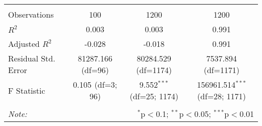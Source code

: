 \begin{table}[!htbp]
\begin{tabular}{@{\extracolsep{5pt}}lccc}
\hline \\[-1.8ex]
 Observations & 100 & 1200 & 1200 \\
 $R^2$ & 0.003 & 0.003 & 0.991 \\
 Adjusted $R^2$ & -0.028 & -0.018 & 0.991 \\
 Residual Std. Error & 81287.166 (df=96) & 80284.529 (df=1174) & 7537.894 (df=1171) \\
 F Statistic & 0.105$^{}$ (df=3; 96) & 9.552$^{***}$ (df=25; 1174) & 156961.514$^{***}$ (df=28; 1171) \\
\hline
\hline \\[-1.8ex]
\textit{Note:} & \multicolumn{3}{r}{$^{*}$p$<$0.1; $^{**}$p$<$0.05; $^{***}$p$<$0.01} \\
\end{tabular}
\end{table}